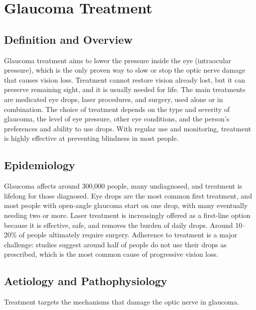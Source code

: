 \chapter{Glaucoma Treatment}

\section*{Definition and Overview}
Glaucoma treatment aims to lower the pressure inside the eye (intraocular pressure), which is the only proven way to slow or stop the optic nerve damage that causes vision loss. Treatment cannot restore vision already lost, but it can preserve remaining sight, and it is usually needed for life. The main treatments are medicated eye drops, laser procedures, and surgery, used alone or in combination. The choice of treatment depends on the type and severity of glaucoma, the level of eye pressure, other eye conditions, and the person's preferences and ability to use drops. With regular use and monitoring, treatment is highly effective at preventing blindness in most people.

\section*{Epidemiology}
Glaucoma affects around 300,000 people, many undiagnosed, and treatment is lifelong for those diagnosed. Eye drops are the most common first treatment, and most people with open-angle glaucoma start on one drop, with many eventually needing two or more. Laser treatment is increasingly offered as a first-line option because it is effective, safe, and removes the burden of daily drops. Around 10--20\% of people ultimately require surgery. Adherence to treatment is a major challenge: studies suggest around half of people do not use their drops as prescribed, which is the most common cause of progressive vision loss.

\section*{Aetiology and Pathophysiology}
Treatment targets the mechanisms that damage the optic nerve in glaucoma.

